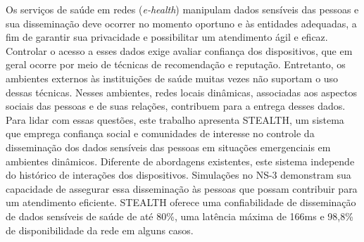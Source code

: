 \documentclass[12pt]{article}
\begin{document}
\begin{resumo} 

Os serviços de saúde em redes (\textit{e-health}) manipulam dados sensíveis das pessoas e sua disseminação deve ocorrer no momento oportuno e às entidades adequadas, a fim de garantir sua privacidade e possibilitar um atendimento ágil e eficaz.
Controlar o
acesso a esses dados exige
avaliar
confiança dos dispositivos, que em geral ocorre por meio de técnicas de recomendação e reputação. Entretanto, os ambientes externos às instituições de saúde muitas vezes
não suportam
o uso dessas técnicas. Nesses ambientes, redes locais dinâmicas, associadas aos aspectos sociais das pessoas e de suas relações, contribuem para a entrega desses dados. Para lidar com essas questões, este trabalho apresenta \mbox{STEALTH}, um sistema que emprega confiança social e comunidades de interesse no controle da disseminação dos dados sensíveis das pessoas em situações emergenciais em ambientes dinâmicos. Diferente de abordagens existentes, este sistema independe do histórico de interações dos dispositivos. Simulações no NS-3 demonstram sua capacidade de assegurar essa disseminação às pessoas que possam contribuir para um atendimento eficiente. \mbox{STEALTH} oferece uma confiabilidade de disseminação de dados sensíveis de saúde de até 80\%, uma latência máxima de 166ms e 98,8\% de disponibilidade da rede em alguns casos.

\end{resumo}
\end{document}
